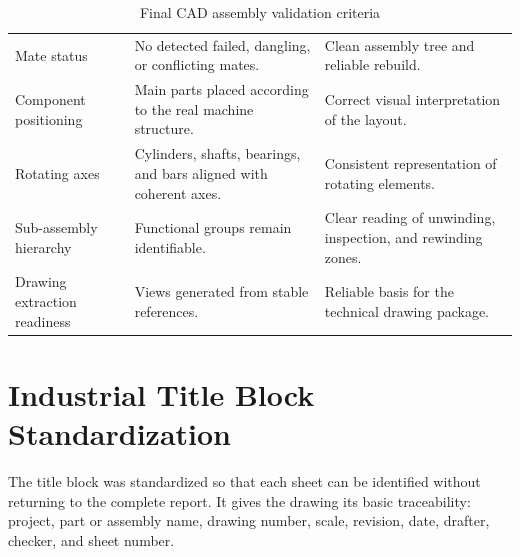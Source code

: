 \begin{table}[H]
\centering
\small
\caption{Final CAD assembly validation criteria}
\label{tab:chapter2-4}
\begin{tabularx}{\textwidth}{|P{0.25\textwidth}|P{0.34\textwidth}|Y|}
\hline
{}
 &  &  \\
\hline
Mate status & No detected failed, dangling, or conflicting mates. & Clean assembly tree and reliable rebuild. \\
\hline
Component positioning & Main parts placed according to the real machine structure. & Correct visual interpretation of the layout. \\
\hline
Rotating axes & Cylinders, shafts, bearings, and bars aligned with coherent axes. & Consistent representation of rotating elements. \\
\hline
Sub-assembly hierarchy & Functional groups remain identifiable. & Clear reading of unwinding, inspection, and rewinding zones. \\
\hline
Drawing extraction readiness & Views generated from stable references. & Reliable basis for the technical drawing package. \\
\hline
\end{tabularx}
\end{table}

\section{Industrial Title Block Standardization}

The title block was standardized so that each sheet can be identified without returning to the complete report. It gives the drawing its basic traceability: project, part or assembly name, drawing number, scale, revision, date, drafter, checker, and sheet number.

